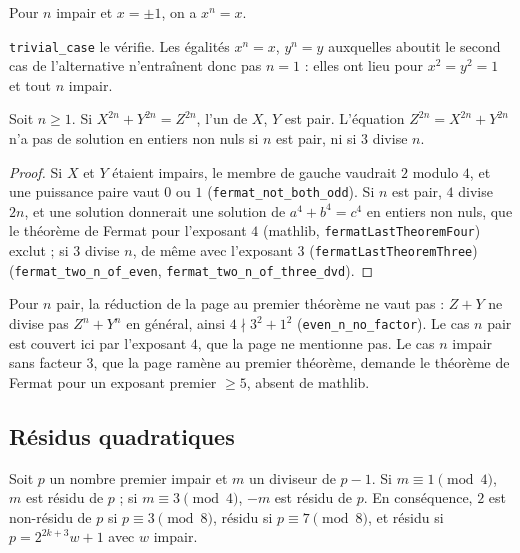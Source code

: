 \begin{enonce}
Pour $n$ impair et $x = \pm 1$, on a $x^n = x$.
\end{enonce}

\texttt{trivial\_case} le vérifie. Les égalités $x^n = x$, $y^n = y$ auxquelles aboutit le second cas de l'alternative n'entraînent donc pas $n = 1$ : elles ont lieu pour $x^2 = y^2 = 1$ et tout $n$ impair.

\begin{enonce}
Soit $n \geq 1$. Si $X^{2n} + Y^{2n} = Z^{2n}$, l'un de $X$, $Y$ est pair. L'équation $Z^{2n} = X^{2n} + Y^{2n}$ n'a pas de solution en entiers non nuls si $n$ est pair, ni si $3$ divise $n$.
\end{enonce}

\begin{proof}
Si $X$ et $Y$ étaient impairs, le membre de gauche vaudrait $2$ modulo $4$, et une puissance paire vaut $0$ ou $1$ (\texttt{fermat\_not\_both\_odd}). Si $n$ est pair, $4$ divise $2n$, et une solution donnerait une solution de $a^4 + b^4 = c^4$ en entiers non nuls, que le théorème de Fermat pour l'exposant $4$ (mathlib, \texttt{fermatLastTheoremFour}) exclut ; si $3$ divise $n$, de même avec l'exposant $3$ (\texttt{fermatLastTheoremThree}) (\texttt{fermat\_two\_n\_of\_even}, \texttt{fermat\_two\_n\_of\_three\_dvd}).
\end{proof}

\begin{remarque}
Pour $n$ pair, la réduction de la page au premier théorème ne vaut pas : $Z + Y$ ne divise pas $Z^n + Y^n$ en général, ainsi $4 \nmid 3^2 + 1^2$ (\texttt{even\_n\_no\_factor}). Le cas $n$ pair est couvert ici par l'exposant $4$, que la page ne mentionne pas. Le cas $n$ impair sans facteur $3$, que la page ramène au premier théorème, demande le théorème de Fermat pour un exposant premier $\geq 5$, absent de mathlib.
\end{remarque}

\subsection*{Résidus quadratiques}

\begin{enonce}
Soit $p$ un nombre premier impair et $m$ un diviseur de $p-1$. Si $m \equiv 1 \pmod 4$, $m$ est résidu de $p$ ; si $m \equiv 3 \pmod 4$, $-m$ est résidu de $p$. En conséquence, $2$ est non-résidu de $p$ si $p \equiv 3 \pmod 8$, résidu si $p \equiv 7 \pmod 8$, et résidu si $p = 2^{2k+3}w + 1$ avec $w$ impair.
\end{enonce}

